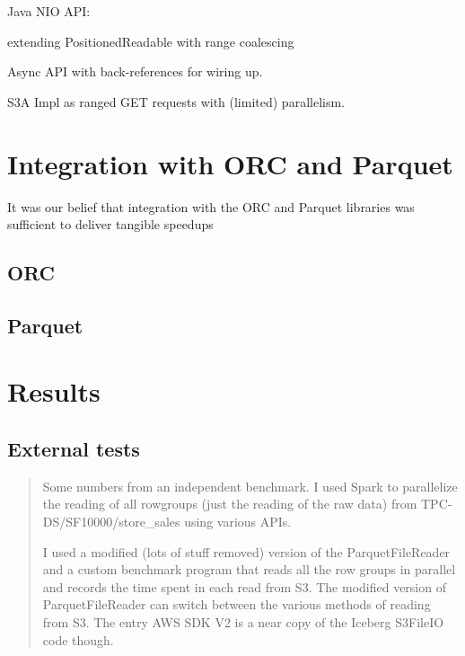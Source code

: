 \documentclass[manuscript]{acmart}
\begin{document}
Java NIO API:

extending PositionedReadable with range coalescing

Async API with back-references for wiring up.

S3A Impl as ranged GET requests with (limited) parallelism.


\section{Integration with ORC and Parquet}
\label{sec:integration}

It was our belief that integration with the ORC and Parquet libraries was
sufficient to deliver tangible speedups
\subsection{ORC}\label{subsec:orc}

\subsection{Parquet}\label{subsec:parquet}



\section{Results}
\label{sec:results}

\subsection{External tests}\label{subsec:external-tests}

\begin{quotation}
 Some numbers from an independent benchmark.
 I used Spark to parallelize the reading of all rowgroups (just the reading of the raw data)
 from TPC-DS/SF10000/store_sales using various APIs.

I used a modified (lots of stuff removed) version of the ParquetFileReader and a custom
benchmark program that reads all the row groups in parallel and records the time spent in each read from S3.
The modified version of ParquetFileReader can switch between the various methods of reading from S3.
The entry AWS SDK V2 is a near copy of the Iceberg S3FileIO code though.

\end{quotation}
\end{document}
